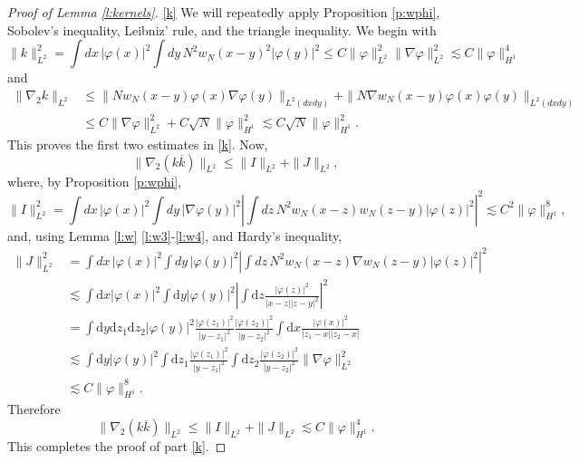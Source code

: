 \documentclass[11pt,a4paper,DIV11]{scrartcl}	%
\newcommand{\di}{\textrm{d}}		%
\newcommand{\norm}[1]{\lVert#1\rVert}	%
\begin{document}
\begin{proof}[Proof of Lemma \ref{l:kernels}]
\hspace{-0.3em} %
\ref{k} We will repeatedly apply Proposition \ref{p:wphi}, Sobolev's
  inequality, Leibniz' rule, and the triangle inequality. We begin with
  \[
    \| k \|_{L^2}^2 = \int dx \, |\varphi(x)|^2 \int dy \, N^2 w_N(x-y)^2
    |\varphi(y)|^2 \le C \| \varphi \|_{L^2}^2 \| \nabla \varphi \|_{L^2}^2
    \apprle C \| \varphi \|_{H^1}^4
  \]
  and
  \begin{align*}
    \| \nabla_2 k \|_{L^2} & \le \| N w_N(x-y) \varphi(x) \nabla \varphi(y)
    \|_{L^2(dx dy)} + \| N \nabla w_N(x-y) \varphi(x) \varphi(y) \|_{L^2(dx dy)} \\
    & \le C \| \nabla \varphi \|_{L^2}^2 + C \sqrt{N} \| \varphi \|_{H^1}^2
    \apprle C \sqrt{N} \| \varphi \|_{H^1}^2.
  \end{align*}
  This proves the first two estimates in \ref{k}. Now,
  \[
    \| \nabla_2 (k \overline{k}) \|_{L^2} \le \| I \|_{L^2} + \| J \|_{L^2},
  \]
  where, by Proposition \ref{p:wphi},
  \[
    \| I \|_{L^2}^2 = \int dx \, |\varphi(x)|^2 \int dy \, |\nabla
    \varphi(y)|^2 \left| \int dz \, N^2 w_N(x-z) w_N(z-y) |\varphi(z)|^2
    \right|^2 \apprle C^2 \| \varphi \|_{H^1}^8,
  \]
  and, using Lemma \ref{l:w} \ref{l:w3}-\ref{l:w4}, and Hardy's inequality,
  \begin{align*}
    \| J \|_{L^2}^2 & = \int dx \, |\varphi(x)|^2 \int dy \, |\varphi(y)|^2
    \left| \int dz \, N^2 w_N(x-z) \nabla w_N(z-y) |\varphi(z)|^2 \right|^2 \\
& \apprle \int \di x\lvert\varphi(x)\rvert^2 \int \di y \lvert \varphi(y)\rvert^2
\left\lvert \int \di z \frac{\lvert\varphi(z)\rvert^2}{\lvert x-z\rvert
\lvert z-y\rvert^2} \right\rvert^2 \\
& = \int \di y\di z_1 \di z_2 \lvert \varphi(y)\rvert^2 \frac{\lvert \varphi(z_1)\rvert^2}{\lvert y-z_1\rvert^2} \frac{\lvert\varphi(z_2)\rvert^2}{\lvert y-z_2\rvert^2} \int \di x \frac{\lvert \varphi(x)\rvert^2}{\lvert z_1-x\rvert \lvert z_2 - x\rvert} \\
& \apprle \int \di y \lvert \varphi(y)\rvert^2 \int \di z_1 \frac{\lvert \varphi(z_1)\rvert^2}{\lvert y-z_1\rvert^2} \int \di z_2 \frac{\lvert \varphi(z_2)\rvert^2}{\lvert y-z_2\rvert^2} \norm{\nabla \varphi}_{L^2}^2\\
& \apprle C \norm{\varphi}_{H^1}^8.
  \end{align*}
  Therefore
  \[
    \| \nabla_2 (k \overline{k}) \|_{L^2} \le \| I \|_{L^2} + \| J \|_{L^2}
    \apprle C \| \varphi \|_{H^1}^4.
  \]
  This completes the proof of part \ref{k}.


\end{proof}
\end{document}
